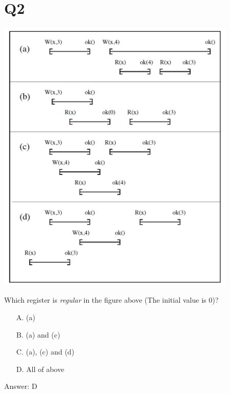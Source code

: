 \documentclass[twoside]{article}
\begin{document}
\section*{Q2}
\begin{center}
	\centering
	\includegraphics[width=4.5in]{q2.png}
\end{center}
Which register is \emph{regular} in the figure above (The initial value is 0)?
\begin{enumerate}
	\item[A.] (a)
	\item[B.] (a) and (c)
	\item[C.] (a),  (c) and (d)
	\item[D.] All of above
\end{enumerate}
Answer: D
\end{document}

